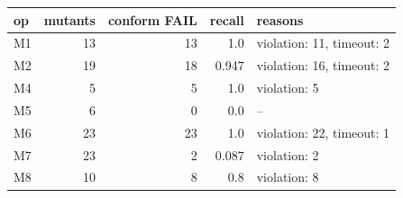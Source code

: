 \begin{tabular}{lrrrl}
\toprule
\textbf{op} & \textbf{mutants} & \textbf{conform FAIL} & \textbf{recall} & \textbf{reasons} \\
\midrule
M1 & 13 & 13 & 1.0 & violation: 11, timeout: 2 \\
M2 & 19 & 18 & 0.947 & violation: 16, timeout: 2 \\
M4 & 5 & 5 & 1.0 & violation: 5 \\
M5 & 6 & 0 & 0.0 & -- \\
M6 & 23 & 23 & 1.0 & violation: 22, timeout: 1 \\
M7 & 23 & 2 & 0.087 & violation: 2 \\
M8 & 10 & 8 & 0.8 & violation: 8 \\
\bottomrule
\end{tabular}
